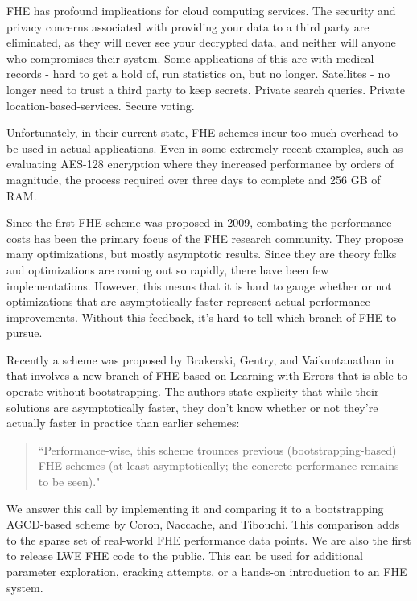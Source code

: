 \documentclass[letterpaper,twocolumn,10pt]{article}
\begin{document}
FHE has profound implications for cloud computing services. The security and privacy concerns associated with providing your data to a third party are eliminated, as they will never see your decrypted data, and neither will anyone who compromises their system. Some applications of this are with medical records - hard to get a hold of, run statistics on, but no longer. Satellites - no longer need to trust a third party to keep secrets. Private search queries. Private location-based-services. Secure voting.

Unfortunately, in their current state, FHE schemes incur too much overhead to be used in actual applications. Even in some extremely recent examples, such as evaluating AES-128 encryption where they increased performance by orders of magnitude, the process required over three days to complete and 256 GB of RAM\cite{AES}. 

Since the first FHE scheme was proposed in 2009, combating the performance costs has been the primary focus of the FHE research community. They propose many optimizations, but mostly asymptotic results. Since they are theory folks and optimizations are coming out so rapidly, there have been few implementations. However, this means that it is hard to gauge whether or not optimizations that are asymptotically faster represent actual performance improvements. Without this feedback, it's hard to tell which branch of FHE to pursue.

Recently a scheme was proposed by Brakerski, Gentry, and Vaikuntanathan in \cite{SansBootstrapping} that involves a new branch of FHE based on Learning with Errors that is able to operate without bootstrapping. The authors state explicity that while their solutions are asymptotically faster, they don't know whether or not they're actually faster in practice than earlier schemes:

\begin{quotation}
``Performance-wise, this scheme trounces previous (bootstrapping-based) FHE schemes (at least asymptotically; the concrete performance remains to be seen)."
\end{quotation}

We answer this call by implementing it and comparing it to a bootstrapping AGCD-based scheme by Coron, Naccache, and Tibouchi. This comparison adds to the sparse set of real-world FHE performance data points. We are also the first to release LWE FHE code to the public. This can be used for additional parameter exploration, cracking attempts, or a hands-on introduction to an FHE system.
\end{document}
